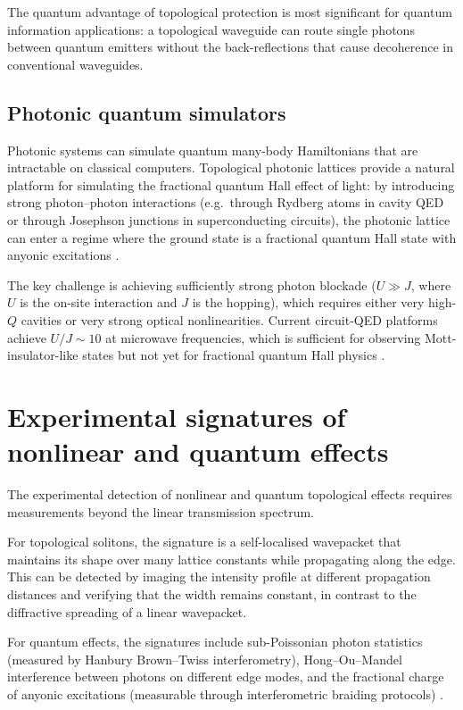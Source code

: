 The quantum advantage of topological protection is most significant
for quantum information applications: a topological waveguide can
route single photons between quantum emitters without the back-reflections
that cause decoherence in conventional waveguides.

\subsection{Photonic quantum simulators}
\label{sec:ch18-quantum-simulator}

Photonic systems can simulate quantum many-body Hamiltonians that are
intractable on classical computers.  Topological photonic lattices
provide a natural platform for simulating the fractional quantum Hall
effect of light: by introducing strong photon--photon interactions
(e.g.\ through Rydberg atoms in cavity QED or through Josephson
junctions in superconducting circuits), the photonic lattice can
enter a regime where the ground state is a fractional quantum Hall
state with anyonic excitations
\cite{ozawa2018topological,price2022roadmap}.

The key challenge is achieving sufficiently strong photon blockade
($U\gg J$, where $U$ is the on-site interaction and $J$ is the
hopping), which requires either very high-$Q$ cavities or very strong
optical nonlinearities.  Current circuit-QED platforms achieve
$U/J\sim 10$ at microwave frequencies, which is sufficient for
observing Mott-insulator-like states but not yet for fractional quantum
Hall physics \cite{ozawa2018topological}.

\section{Experimental signatures of nonlinear and quantum effects}
\label{sec:ch18-signatures}

The experimental detection of nonlinear and quantum topological
effects requires measurements beyond the linear transmission spectrum.

For topological solitons, the signature is a self-localised
wavepacket that maintains its shape over many lattice constants while
propagating along the edge.  This can be detected by imaging the
intensity profile at different propagation distances and verifying that
the width remains constant, in contrast to the diffractive spreading
of a linear wavepacket.

For quantum effects, the signatures include sub-Poissonian photon
statistics (measured by Hanbury Brown--Twiss interferometry),
Hong--Ou--Mandel interference between photons on different edge modes,
and the fractional charge of anyonic excitations (measurable through
interferometric braiding protocols)
\cite{price2022roadmap,ozawa2018topological}.

